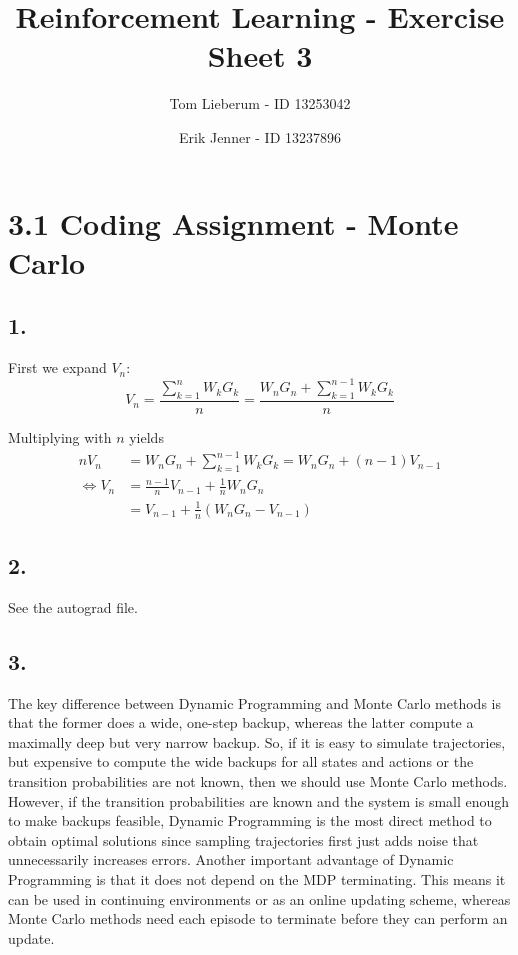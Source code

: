 \documentclass{article}
\title{Reinforcement Learning - Exercise Sheet 3}
\author{Tom Lieberum - ID 13253042 \and Erik Jenner - ID 13237896}
\begin{document}
\maketitle

\section*{3.1 Coding Assignment - Monte Carlo}

\subsection*{1.}

First we expand $V_n$:
\[
V_n = \frac{\sum_{k=1}^n W_kG_k}{n} = \frac{W_nG_n + \sum_{k=1}^{n-1} W_kG_k}{n}
\]

\noindent Multiplying with $n$ yields
\begin{align*}
nV_n &= W_nG_n + \sum_{k=1}^{n-1} W_kG_k = W_nG_n + (n-1) V_{n-1}\\[2mm] \iff V_n &= \frac{n-1}{n} V_{n-1} + \frac{1}{n}W_nG_n\\[2mm] &= V_{n-1} + \frac{1}{n}(W_nG_n - V_{n-1}) 
\end{align*}


\subsection*{2.}
See the autograd file.

\subsection*{3.}
The key difference between Dynamic Programming and Monte Carlo methods is that the former does a wide, one-step backup, whereas the latter compute a maximally deep but very narrow backup. So, if it is easy to simulate trajectories, but expensive to compute the wide backups for all states and actions or the transition probabilities are not known, then we should use Monte Carlo methods. However, if the transition probabilities are known and the system is small enough to make backups feasible, Dynamic Programming is the most direct method to obtain optimal solutions since sampling trajectories first just adds noise that unnecessarily increases errors. Another important advantage of Dynamic Programming is that it does not depend on the MDP terminating. This means it can be used in continuing environments or as an online updating scheme, whereas Monte Carlo methods need each episode to terminate before they can perform an update.
\end{document}
